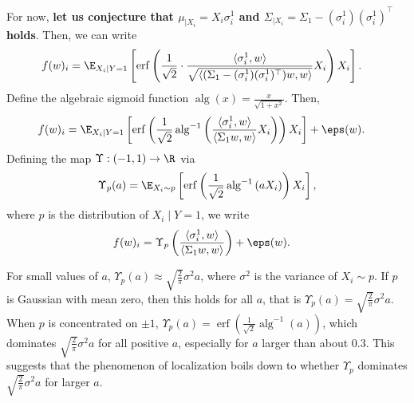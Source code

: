\documentclass[usletter,twoside,12pt]{book}
\begin{document}
For now, \textbf{let us conjecture that $\mu_{\mid X_i} = X_i \sigma_i^1$ and $\Sigma_{\mid X_i} = \Sigma_1 - (\sigma_i^1) (\sigma_i^1)^\top$ holds}.
Then, we can write
\begin{align}
   f(w)_i &= \E_{X_i \mid Y=1} \left[ \operatorname{erf} \left( \frac{1}{\sqrt{2}} \cdot \frac{ \langle \sigma_i^1, w \rangle }{ \sqrt{ \langle (\Sigma_1 - (\sigma_i^1) (\sigma_i^1)^\top) w, w \rangle } } X_i \right) X_i \right].
\end{align}
Define the algebraic sigmoid function $\operatorname{alg}(x) = \frac{x}{\sqrt{1+x^2}}$.
Then,
\begin{align}
   f(w)_i &= \E_{X_i \mid Y=1} \left[ \operatorname{erf} \left( \frac{1}{\sqrt{2}} \operatorname{alg}^{-1}\left( \frac{\langle \sigma_i^1, w \rangle}{\langle \Sigma_1 w, w \rangle} X_i \right) \right) X_i \right] + \eps(w).
\end{align}
Defining the map $\Upsilon : (-1,1) \to \R$ via
\begin{align}
   \Upsilon_p(a) = \E_{X_i \sim p} \left[ \operatorname{erf} \left( \frac{1}{\sqrt{2}} \operatorname{alg}^{-1}\left( a X_i \right) \right) X_i \right],
\end{align}
where $p$ is the distribution of $X_i \mid Y=1$, we write
\begin{align}
   f(w)_i &= \Upsilon_p \left( \frac{\langle \sigma_i^1, w \rangle}{\langle \Sigma_1 w, w \rangle} \right) + \eps(w).
\end{align}

For small values of $a$, $\Upsilon_p(a) \approx \sqrt{\frac{2}{\pi}} \sigma^2 a$, where $\sigma^2$ is the variance of $X_i \sim p$.
If $p$ is Gaussian with mean zero, then this holds for all $a$, that is $\Upsilon_p(a) = \sqrt{\frac{2}{\pi}} \sigma^2 a$.
When $p$ is concentrated on $\pm 1$, $\Upsilon_p(a) = \operatorname{erf} \left( \frac{1}{\sqrt{2}} \operatorname{alg}^{-1}\left( a \right) \right)$, which dominates $\sqrt{\frac{2}{\pi}} \sigma^2 a$ for all positive $a$, especially for $a$ larger than about 0.3.
This suggests that the phenomenon of localization boils down to whether $\Upsilon_p$ dominates $\sqrt{\frac{2}{\pi}} \sigma^2 a$ for larger $a$.
\end{document}
